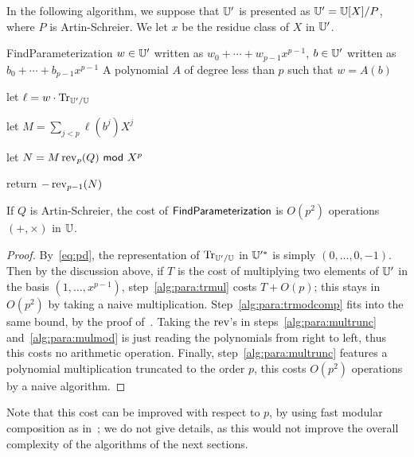 In the following algorithm, we suppose that $\mathbb{U}'$ is presented as
$\mathbb{U}'=\mathbb{U}[X]/P$, where $P$ is Artin-Schreier. We let $x$ be the residue
class of $X$ in $\mathbb{U}'$.
\begin{algorithm}{FindParameterization}
  {$w \in \mathbb{U}'$ written as $w_0 + \cdots + w_{p-1} x^{p-1}$,  
   $b \in \mathbb{U}'$ written as $b_0 + \cdots + b_{p-1} x^{p-1}$}
  {A polynomial $A$ of degree less than $p$ such that $w=A(b)$}
\item\label{alg:para:trmul} let $\ell = w \cdot\operatorname{Tr}_{\mathbb{U}'/\mathbb{U}}$
\item\label{alg:para:trmodcomp} let $M= \sum_{j < p}\ell(b^j)X^j$
\item\label{alg:para:multrunc} let $N = M \operatorname{rev}_{p}(Q) {\sf ~mod~} X^{p}$
\item\label{alg:para:mulmod} return $-\operatorname{rev}_{p-1}(N)$
\end{algorithm}
\begin{proposition}
  \label{th:findparameterization}
  If $Q$ is Artin-Schreier, the cost of ${\sf FindParameterization}$ is
  $O(p^2)$ operations $(+,\times)$ in $\mathbb{U}$.
\end{proposition}
\begin{proof} By~\ref{eq:pd}, the representation of $\operatorname{Tr}_{\mathbb{U}'/\mathbb{U}}$ in
$\mathbb{U}'^\ast$ is simply $(0,\ldots,0,-1)$. Then by the discussion above,
if $T$ is the cost of multiplying two elements of $\mathbb{U}'$ in the basis
$(1,\ldots,x^{p-1})$, step~\ref{alg:para:trmul} costs $T + O(p)$; this
stays in $O(p^2)$ by taking a naive
multiplication. Step~\ref{alg:para:trmodcomp} fits into the same
bound, by the proof of~\cite[Th.~4]{Sho94}. Taking the $\operatorname{rev}$'s in
steps~\ref{alg:para:multrunc} and~\ref{alg:para:mulmod} is just
reading the polynomials from right to left, thus this costs no
arithmetic operation. Finally, step~\ref{alg:para:multrunc} features a
polynomial multiplication truncated to the order $p$, this costs
$O(p^2)$ operations by a naive algorithm.\end{proof}

Note that this cost can be improved with respect to $p$, by using fast
modular composition as in~\cite{Sho94}; we do not give details, as this
would not improve the overall complexity of the algorithms of the next
sections.


%
